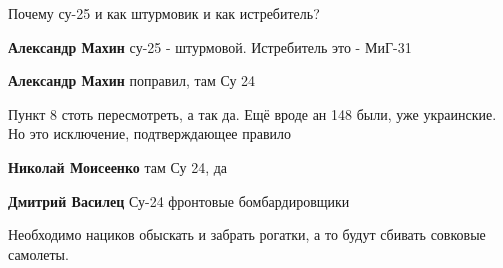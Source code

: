 \begin{itemize}
Почему су-25 и как штурмовик и как истребитель?

\begin{itemize}

 
\textbf{Александр Махин} су-25 - штурмовой. Истребитель это - МиГ-31

 
\textbf{Александр Махин} поправил, там Су 24
\end{itemize}

\par
 

Пункт 8 стоть пересмотреть, а так да. Ещё вроде ан 148 были, уже украинские. Но
это исключение, подтверждающее правило

\begin{itemize}
 
\textbf{Николай Моисеенко} там Су 24, да

 
\textbf{Дмитрий Василец} Су-24 фронтовые бомбардировщики
\end{itemize}

 
Необходимо нациков обыскать и забрать рогатки, а то будут сбивать совковые
самолеты.


\end{itemize}
